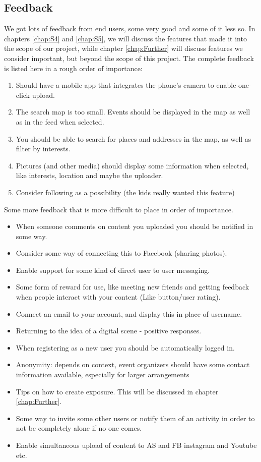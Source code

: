 \subsection{Feedback}
\label{subsec:S2PresentationFeedback}

We got lots of feedback from end users, some very good and some of it less so.  In chapters \ref{chap:S4} and \ref{chap:S5}, we will discuss the features that made it into the scope of our project, while chapter \ref{chap:Further} will discuss features we consider important, but beyond the scope of this project. The complete feedback is listed here in a rough order of importance:

\begin{enumerate}
  \item Should have a mobile app that integrates the phone’s camera to enable one-click upload.
  \item The search map is too small. Events should be displayed in the map as well as in the feed when selected.
  \item You should be able to search for places and addresses in the map, as well as filter by interests.
  \item Pictures (and other media) should display some information when selected, like interests, location and maybe the uploader.
  \item Consider following as a possibility (the kids really wanted this feature) 
\end{enumerate}

Some more feedback that is more difficult to place in order of importance.

\begin{itemize}
  \item When someone comments on content you uploaded you should be notified in some way.
  \item Consider some way of connecting this to Facebook (sharing photos).
  \item Enable support for some kind of direct user to user messaging.
  \item Some form of reward for use, like meeting new friends and getting feedback when people interact with your content (Like button/user rating).
  \item Connect an email to your account, and display this in place of username.
  \item Returning to the idea of a digital scene - positive responses.
  \item When registering as a new user you should be automatically logged in.
  \item Anonymity: depends on context, event organizers should have some contact information available, especially for larger arrangements
  \item Tips on how to create exposure. This will be discussed in chapter \ref{chap:Further}.
  \item Some way to invite some other users or notify them of an activity in order to not be completely alone if no one comes.
  \item Enable simultaneous upload of content to AS and FB instagram and Youtube etc.
\end{itemize}


